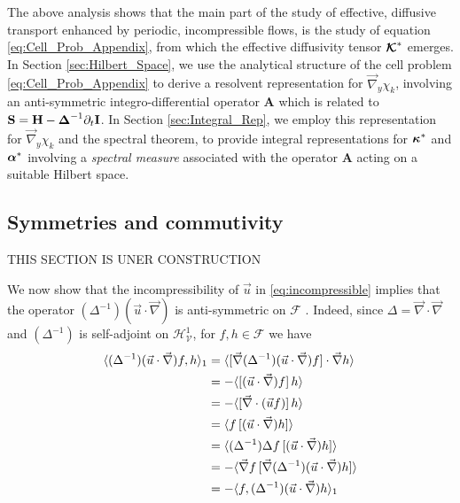 \documentclass[11pt]{amsart}
\newcommand{\Hb}{\mathbf{H}}
\newcommand{\Ib}{\mathbf{I}}
\newcommand{\Sb}{\mathbf{S}}
\newcommand{\Ab}{\mathbf{A}}
\newcommand\Kbc{\mbox{\boldmath${\mathcal{K}}$}}
\newcommand{\Vc}{\mathcal{V}}
\newcommand{\Hc}{\mathcal{H}}
\newcommand{\Fc}{\mathcal{F}}
\newcommand\balpha{\mbox{\boldmath${\alpha}$}}
\newcommand\bDelta{\mbox{\boldmath${\Delta}$}}
\newcommand\bkappa{\mbox{\boldmath${\kappa}$}}
\begin{document}
The above analysis shows that the main part of the study of effective, 
diffusive transport enhanced by periodic, incompressible flows, is the
study of equation \eqref{eq:Cell_Prob_Appendix}, from which the
effective diffusivity tensor $\Kbc^*$ emerges. In Section
\ref{sec:Hilbert_Space}, we use the analytical structure of the cell
problem \eqref{eq:Cell_Prob_Appendix} to derive a resolvent
representation for $\vec{\nabla}_y\chi_k$, involving an anti-symmetric
integro-differential operator $\Ab$ which is related to 
$\Sb=\Hb-\bDelta^{-1}\partial_t\Ib$. In Section \ref{sec:Integral_Rep}, 
we employ this representation for $\vec{\nabla}_y\chi_k$ and the spectral
theorem, to provide integral representations for $\bkappa^*$ and
$\balpha^*$ involving a \emph{spectral measure} associated with the
operator $\Ab$ acting on a suitable Hilbert space.     
   

\subsection{Symmetries and commutivity}\label{sec:Symmetries_Commute}
%
THIS SECTION IS UNER CONSTRUCTION

We now show that the incompressibility of $\vec{u}$ in
\eqref{eq:incompressible} implies that the operator
$(\Delta^{-1})(\vec{u}\cdot\vec{\nabla})$ is anti-symmetric on $\Fc$
\cite{Bhattacharya:AAP:1999:951}. Indeed, since $\Delta=\vec{\nabla}\cdot\vec{\nabla}$
and $(\Delta^{-1})$ is self-adjoint on $\Hc^1_{\Vc}$, for $f,h\in\Fc$ we have 
%
\begin{align}\label{eq:Anti-sym_Sobolov}
  \langle(\Delta^{-1})(\vec{u}\cdot\vec{\nabla})f,h\rangle_1
                            &=\langle[\vec{\nabla}(\Delta^{-1})(\vec{u}\cdot\vec{\nabla})f]\cdot\vec{\nabla}h\rangle
                                 \\                              
                              &=-\langle[(\vec{u}\cdot\vec{\nabla})f]\,h\rangle
                                 \notag\\
                               &=-\langle[\vec{\nabla}\cdot(\vec{u}f)]\,h\rangle
                                 \notag\\     
                              &=\langle f\,[(\vec{u}\cdot\vec{\nabla})h]\rangle
                                \notag\\
                              &=\langle(\Delta^{-1})\Delta f\,[(\vec{u}\cdot\vec{\nabla})h]\rangle
                                \notag\\
                              &=-\langle\vec{\nabla}f\,[\vec{\nabla}(\Delta^{-1})(\vec{u}\cdot\vec{\nabla})h]\rangle
                                \notag\\                              
                              &=-\langle f,(\Delta^{-1})(\vec{u}\cdot\vec{\nabla})h\rangle_1
                              \notag
\end{align}
%
%
\end{document}
